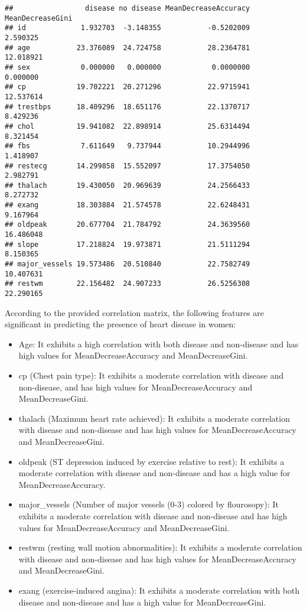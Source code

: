 \documentclass[
]{article}
\providecommand{\tightlist}{%
  \setlength{\itemsep}{0pt}\setlength{\parskip}{0pt}}
\begin{document}
\begin{verbatim}
##                 disease no disease MeanDecreaseAccuracy MeanDecreaseGini
## id             1.932703  -3.148355           -0.5202009         2.590325
## age           23.376089  24.724758           28.2364781        12.018921
## sex            0.000000   0.000000            0.0000000         0.000000
## cp            19.702221  20.271296           22.9715941        12.537614
## trestbps      18.409296  18.651176           22.1370717         8.429236
## chol          19.941082  22.898914           25.6314494         8.321454
## fbs            7.611649   9.737944           10.2944996         1.418907
## restecg       14.299858  15.552097           17.3754050         2.982791
## thalach       19.430050  20.969639           24.2566433         8.272732
## exang         18.303884  21.574578           22.6248431         9.167964
## oldpeak       20.677704  21.784792           24.3639560        16.486048
## slope         17.218824  19.973871           21.5111294         8.150365
## major_vessels 19.573486  20.510840           22.7582749        10.407631
## restwm        22.156482  24.907233           26.5256308        22.290165
\end{verbatim}

According to the provided correlation matrix, the following features are
significant in predicting the presence of heart disease in women:

\begin{itemize}
\tightlist
\item
  Age: It exhibits a high correlation with both disease and non-disease
  and has high values for MeanDecreaseAccuracy and MeanDecreaseGini.
\item
  cp (Chest pain type): It exhibits a moderate correlation with disease
  and non-disease, and has high values for MeanDecreaseAccuracy and
  MeanDecreaseGini.
\item
  thalach (Maximum heart rate achieved): It exhibits a moderate
  correlation with disease and non-disease and has high values for
  MeanDecreaseAccuracy and MeanDecreaseGini.
\item
  oldpeak (ST depression induced by exercise relative to rest): It
  exhibits a moderate correlation with disease and non-disease and has a
  high value for MeanDecreaseAccuracy.
\item
  major\_vessels (Number of major vessels (0-3) colored by flourosopy):
  It exhibits a moderate correlation with disease and non-disease and
  has high values for MeanDecreaseAccuracy and MeanDecreaseGini.
\item
  restwm (resting wall motion abnormalities): It exhibits a moderate
  correlation with disease and non-disease and has high values for
  MeanDecreaseAccuracy and MeanDecreaseGini.
\item
  exang (exercise-induced angina): It exhibits a moderate correlation
  with both disease and non-disease and has a high value for
  MeanDecreaseGini.
\end{itemize}
\end{document}
